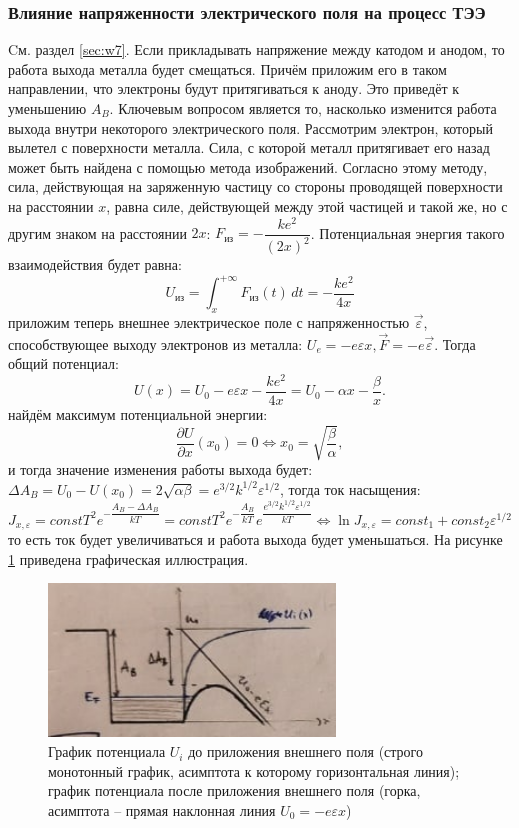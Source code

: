 \subsubsection{Влияние напряженности электрического поля на процесс ТЭЭ}
\label{sec:o244}
Cм. раздел \ref{sec:w7}. Если прикладывать напряжение между катодом и анодом, то работа
выхода металла будет смещаться. Причём приложим его в таком направлении, что
электроны будут притягиваться к аноду. Это приведёт к уменьшению $A_B$. Ключевым вопросом
является то, насколько изменится работа выхода внутри некоторого электрического поля.
Рассмотрим электрон, который вылетел с поверхности металла. Сила, с которой металл
притягивает его назад может быть найдена с помощью метода изображений. Согласно этому
методу, сила, действующая на заряженную частицу со стороны проводящей поверхности на расстоянии $x$,
равна силе, действующей между этой частицей и такой же, но с другим знаком на расстоянии $2x$:
$F_\text{из} = - \dfrac{k e^2}{(2x)^2}$. Потенциальная энергия такого
взаимодействия будет равна:
\[
  U_\text{из} = \int_x^{+\infty} F_\text{из} (t) \, dt
  =  - \dfrac{k e^2}{4 x}
\]
приложим теперь внешнее электрическое поле с напряженностью $\vec{\varepsilon}$, способствующее
выходу электронов из металла: $U_e = - e \varepsilon x, \vec{F} = - e \vec{\varepsilon}$.
Тогда общий потенциал:
\[
  U(x) = U_0 - e \varepsilon x - \dfrac{k e^2}{4 x} = U_0 - \alpha x - \dfrac{\beta}{x}.
\]
найдём максимум потенциальной энергии:
\[
  \dfrac{\partial U}{\partial x} (x_0) = 0 \Leftrightarrow x_0 = \sqrt{\dfrac{\beta}{\alpha}},
\]
и тогда значение изменения работы выхода будет:
$\Delta A_B = U_0 - U(x_0) = 2 \sqrt{\alpha \beta} = e^{3/2} k^{1/2} \varepsilon^{1/2}$,
тогда ток насыщения:
\[
  J_{x, \varepsilon}
  = const T^2 e^{-\dfrac{A_B - \Delta A_B}{kT}}
  = const T^2 e^{-\dfrac{A_B}{kT}} e^{ \dfrac{e^{3/2} k^{1/2} \varepsilon^{1/2}}{kT} }
  \Leftrightarrow
  \ln J_{x, \varepsilon}
  = const_1 + const_2 \varepsilon^{1/2}
\]
то есть ток будет увеличиваться и работа выхода будет уменьшаться.
На рисунке \ref{fig:shottki} приведена графическая иллюстрация.

\begin{figure}[H]
  \centering
  \includegraphics[width=.9\linewidth]{img/oral-04/Shottki.png}
  \caption{График потенциала $U_i$ до приложения внешнего поля (строго монотонный график,
  асимптота к которому горизонтальная линия);
  график потенциала после приложения внешнего поля (горка, асимптота -- прямая наклонная линия $U_0 = - e \varepsilon x$)}
  \label{fig:shottki}
\end{figure}


